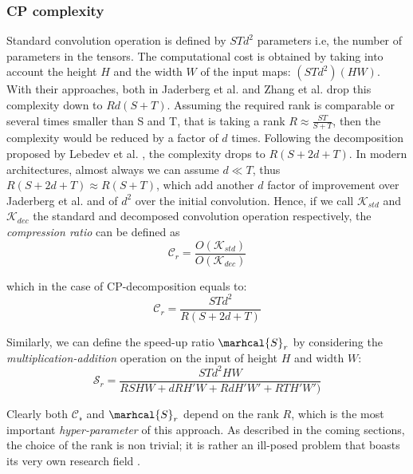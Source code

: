 \subsubsection{CP complexity}
Standard convolution operation is defined by $STd^2$ parameters i.e, the number of parameters in the tensors. The computational cost is obtained by taking into account the height $H$ and the width $W$ of the input maps: $(STd^2)(HW)$. 
\newline
With their approaches, both in Jaderberg et al.\parencite{jaderberg2014} and Zhang et al. \parencite{zhang2015SVD} drop this complexity down to $Rd(S+T)$. Assuming the required rank is comparable or several times smaller than S and T, that is taking a rank $R\approx \frac{ST}{S+T}$, then the complexity would be reduced by a factor of $d$ times. 
\newline 
Following the decomposition proposed by Lebedev et al. \parencite{lebedev}, the complexity drops to $R(S+2d+T)$. In modern architectures, almost always we can assume $d\ll T$, thus $R(S+2d+T) \approx R(S+T)$,  which add another $d$ factor of improvement over Jaderberg et al. and of $d^2$ over the initial convolution. \newline
Hence, if we call $\mathcal{K}_{std}$ and $\mathcal{K}_{dec}$ the standard and decomposed convolution operation respectively,  the \emph{compression ratio} can be defined as
\begin{equation}
    \mathbf{\mathcal{C}}_r = \frac{O(\mathcal{K}_{std})}{O(\mathcal{K}_{dec})}
\end{equation}

which in the case of CP-decomposition equals to: 
\begin{equation}
    \mathcal{C}_r = \frac{STd^2}{R(S+2d+T)}    
\end{equation}

Similarly, we can define the speed-up ratio $\marhcal{S}_r$ by considering the \emph{multiplication-addition} operation on the input of height $H$ and width $W$: 
\begin{equation}
    \mathcal{S}_r = \frac{STd^2HW}{RSHW + dRH'W + RdH'W'+ RTH'W')}    
\end{equation}


Clearly both $\mathcal{C_r}$ and $\marhcal{S}_r$ depend on the rank $R$, which is the most important \emph{hyper-parameter} of this approach. As described in the coming sections, the choice of the rank is non trivial; it is rather an ill-posed problem that boasts its very own research field \parencite{rank-hard1}. 

